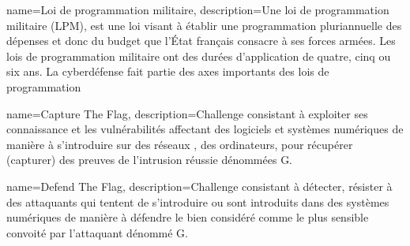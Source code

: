 %
%


{
name={Loi de programmation militaire},
description={Une loi de programmation militaire (LPM), est une loi visant à établir une programmation pluriannuelle des dépenses et donc du budget que l'État français consacre à ses forces armées. Les lois de programmation militaire ont des durées d'application de quatre, cinq ou six ans. La cyberdéfense fait partie des axes importants des lois de programmation}
}

{
name={Capture The Flag},
description={Challenge consistant à exploiter ses connaissance et les vulnérabilités affectant des logiciels  et systèmes numériques de manière à s’introduire sur des réseaux , des ordinateurs, pour récupérer (capturer) des preuves de l’intrusion réussie dénommées G.}
}

{
name={Defend The Flag},
description={Challenge consistant à détecter, résister à des attaquants qui tentent de s'introduire ou sont introduits dans des systèmes numériques de manière à défendre le bien considéré comme le plus sensible convoité par l'attaquant dénommé G.}
}

